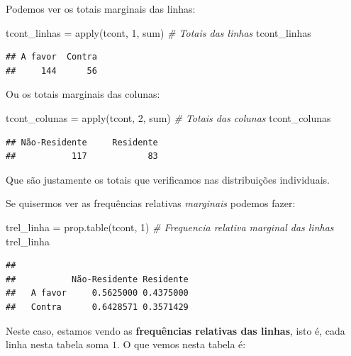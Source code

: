 \documentclass[
]{book}
\newenvironment{Shaded}{\begin{snugshade}}{\end{snugshade}}
\newcommand{\CommentTok}[1]{\textcolor[rgb]{0.56,0.35,0.01}{\textit{#1}}}
\newcommand{\DecValTok}[1]{\textcolor[rgb]{0.00,0.00,0.81}{#1}}
\newcommand{\FunctionTok}[1]{\textcolor[rgb]{0.00,0.00,0.00}{#1}}
\newcommand{\NormalTok}[1]{#1}
\newcommand{\OtherTok}[1]{\textcolor[rgb]{0.56,0.35,0.01}{#1}}
\begin{document}
Podemos ver os totais marginais das linhas:

\begin{Shaded}
\begin{Highlighting}[]
\NormalTok{tcont\_linhas }\OtherTok{=} \FunctionTok{apply}\NormalTok{(tcont, }\DecValTok{1}\NormalTok{, sum) }\CommentTok{\# Totais das linhas}
\NormalTok{tcont\_linhas}
\end{Highlighting}
\end{Shaded}

\begin{verbatim}
## A favor  Contra 
##     144      56
\end{verbatim}

Ou os totais marginais das colunas:

\begin{Shaded}
\begin{Highlighting}[]
\NormalTok{tcont\_colunas }\OtherTok{=} \FunctionTok{apply}\NormalTok{(tcont, }\DecValTok{2}\NormalTok{, sum) }\CommentTok{\# Totais das colunas}
\NormalTok{tcont\_colunas}
\end{Highlighting}
\end{Shaded}

\begin{verbatim}
## Não-Residente     Residente 
##           117            83
\end{verbatim}

Que são justamente os totais que verificamos nas distribuições individuais.

Se quisermos ver as frequências relativas \emph{marginais} podemos fazer:

\begin{Shaded}
\begin{Highlighting}[]
\NormalTok{trel\_linha }\OtherTok{=} \FunctionTok{prop.table}\NormalTok{(tcont, }\DecValTok{1}\NormalTok{) }\CommentTok{\# Frequencia relativa marginal das linhas}
\NormalTok{trel\_linha}
\end{Highlighting}
\end{Shaded}

\begin{verbatim}
##          
##           Não-Residente Residente
##   A favor     0.5625000 0.4375000
##   Contra      0.6428571 0.3571429
\end{verbatim}

Neste caso, estamos vendo as \textbf{frequências relativas das linhas}, isto é, cada linha nesta tabela soma \(1\). O que vemos nesta tabela é:
\end{document}
